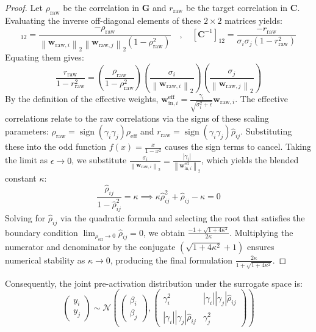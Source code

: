 \documentclass[11pt, a4paper, copyright, gdm]{google}
\newcommand{\norm}[1]{\left\lVert#1\right\rVert}
\newcommand{\wVect}{\boldsymbol{w}}
\newcommand{\calN}{\mathcal{N}}
\newcommand{\Cmat}{\boldsymbol{C}}
\newcommand{\Gmat}{\boldsymbol{G}}
\DeclareMathOperator{\sign}{sign}
\theoremstyle{definition}
\begin{document}
\begin{proof}
Let $\rho_{\text{raw}}$ be the correlation in $\Gmat$ and $r_{\text{raw}}$ be the target correlation in $\Cmat$. Evaluating the inverse off-diagonal elements of these $2 \times 2$ matrices yields:
\begin{equation*}
    [\Gmat^{-1}]_{12} = \frac{-\rho_{\text{raw}}}{\norm{\wVect_{\text{raw},i}}_2 \norm{\wVect_{\text{raw},j}}_2 (1 - \rho_{\text{raw}}^2)} \quad,\quad [\Cmat^{-1}]_{12} = \frac{-r_{\text{raw}}}{\sigma_i \sigma_j (1 - r_{\text{raw}}^2)}
\end{equation*}
Equating them gives:
\begin{equation*}
    \frac{r_{\text{raw}}}{1 - r_{\text{raw}}^2} = \left( \frac{\rho_{\text{raw}}}{1 - \rho_{\text{raw}}^2} \right) \left( \frac{\sigma_i}{\norm{\wVect_{\text{raw},i}}_2} \right) \left( \frac{\sigma_j}{\norm{\wVect_{\text{raw},j}}_2} \right)
\end{equation*}
By the definition of the effective weights, $\wVect_{\text{in},i}^{\text{eff}} = \frac{\gamma_i}{\sqrt{\sigma_i^2+\epsilon}} \wVect_{\text{raw},i}$. The effective correlations relate to the raw correlations via the signs of these scaling parameters: $\rho_{\text{raw}} = \sign(\gamma_i \gamma_j) \rho_{\text{eff}}$ and $r_{\text{raw}} = \sign(\gamma_i \gamma_j) \hat{\rho}_{ij}$. Substituting these into the odd function $f(x) = \frac{x}{1-x^2}$ causes the sign terms to cancel. Taking the limit as $\epsilon \to 0$, we substitute $\frac{\sigma_i}{\norm{\wVect_{\text{raw},i}}_2} = \frac{|\gamma_i|}{\norm{\wVect_{\text{in},i}^{\text{eff}}}_2}$, which yields the blended constant $\kappa$:
\begin{equation*}
    \frac{\hat{\rho}_{ij}}{1 - \hat{\rho}_{ij}^2} = \kappa \implies \kappa \hat{\rho}_{ij}^2 + \hat{\rho}_{ij} - \kappa = 0
\end{equation*}
Solving for $\hat{\rho}_{ij}$ via the quadratic formula and selecting the root that satisfies the boundary condition $\lim_{\rho_{\text{eff}} \to 0} \hat{\rho}_{ij} = 0$, we obtain $\frac{-1 + \sqrt{1 + 4\kappa^2}}{2\kappa}$. Multiplying the numerator and denominator by the conjugate $(\sqrt{1 + 4\kappa^2} + 1)$ ensures numerical stability as $\kappa \to 0$, producing the final formulation $\frac{2\kappa}{1 + \sqrt{1 + 4\kappa^2}}$.
\end{proof}

Consequently, the joint pre-activation distribution under the surrogate space is:
\begin{equation}
\label{eq:joint_pre-activation}
    \begin{pmatrix} y_i \\ y_j \end{pmatrix} \sim \calN \left( \begin{pmatrix} \beta_i \\ \beta_j \end{pmatrix}, \begin{pmatrix} \gamma_i^2 & |\gamma_i| |\gamma_j| \hat{\rho}_{ij} \\ |\gamma_i| |\gamma_j| \hat{\rho}_{ij} & \gamma_j^2 \end{pmatrix} \right)
\end{equation}
\end{document}
